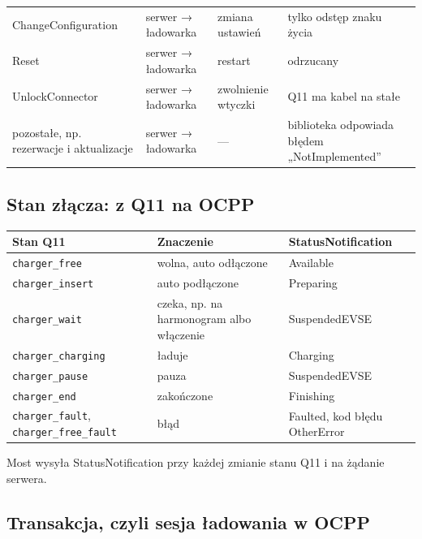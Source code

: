 \documentclass[11pt,a4paper]{article}
\begin{document}
\begin{longtable}{>{\raggedright\arraybackslash}p{4.10cm}>{\raggedright\arraybackslash}p{3.29cm}>{\raggedright\arraybackslash}p{4.40cm}>{\raggedright\arraybackslash}p{3.05cm}}
ChangeConfiguration & serwer {\symbolfont→} ładowarka & zmiana ustawień & \leavevmode{\symbolfont\color{apamber}\textbf{◐}} tylko odstęp znaku życia \\
Reset & serwer {\symbolfont→} ładowarka & restart & \leavevmode{\symbolfont\color{apred}\textbf{✘}} odrzucany \\
UnlockConnector & serwer {\symbolfont→} ładowarka & zwolnienie wtyczki & \leavevmode{\symbolfont\color{apred}\textbf{✘}} Q11 ma kabel na stałe \\
pozostałe, np. rezerwacje i aktualizacje & serwer {\symbolfont→} ładowarka & — & \leavevmode{\symbolfont\color{apred}\textbf{✘}} biblioteka odpowiada błędem „NotImplemented” \\
\end{longtable}

\subsection{Stan złącza: z Q11 na OCPP}

\begin{longtable}{>{\raggedright\arraybackslash}p{5.84cm}>{\raggedright\arraybackslash}p{4.76cm}>{\raggedright\arraybackslash}p{4.67cm}}
\toprule
\rowcolor{apteallight}\textbf{Stan Q11} & \textbf{Znaczenie} & \textbf{StatusNotification} \\
\midrule\endhead
\bottomrule\endfoot
\texttt{charger\_free} & wolna, auto odłączone & Available \\
\texttt{charger\_\allowbreak{}insert} & auto podłączone & Preparing \\
\texttt{charger\_wait} & czeka, np. na harmonogram albo włączenie & SuspendedEVSE \\
\texttt{charger\_\allowbreak{}charging} & ładuje & Charging \\
\texttt{charger\_\allowbreak{}pause} & pauza & SuspendedEVSE \\
\texttt{charger\_end} & zakończone & Finishing \\
\texttt{charger\_\allowbreak{}fault}, \texttt{charger\_\allowbreak{}free\_\allowbreak{}fault} & błąd & Faulted, kod błędu OtherError \\
\end{longtable}

Most wysyła StatusNotification przy każdej zmianie stanu Q11 i na żądanie serwera.


\subsection{Transakcja, czyli sesja ładowania w OCPP}
\end{document}
